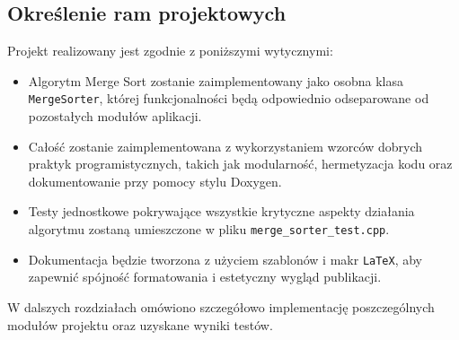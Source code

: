 \subsection{Określenie ram projektowych}
Projekt realizowany jest zgodnie z poniższymi wytycznymi:
\begin{itemize}
  \item Algorytm Merge Sort zostanie zaimplementowany jako osobna klasa \texttt{MergeSorter}, której funkcjonalności będą odpowiednio odseparowane od pozostałych modułów aplikacji.
  \item Całość zostanie zaimplementowana z wykorzystaniem wzorców dobrych praktyk programistycznych, takich jak modularność, hermetyzacja kodu oraz dokumentowanie przy pomocy stylu Doxygen.
  \item Testy jednostkowe pokrywające wszystkie krytyczne aspekty działania algorytmu zostaną umieszczone w pliku \texttt{merge\_sorter\_test.cpp}.
  \item Dokumentacja będzie tworzona z użyciem szablonów i makr \texttt{LaTeX}, aby zapewnić spójność formatowania i estetyczny wygląd publikacji.
\end{itemize}

W dalszych rozdziałach omówiono szczegółowo implementację poszczególnych modułów projektu oraz uzyskane wyniki testów.
